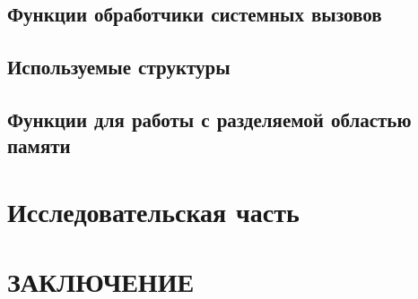 \documentclass{bmstu}
\begin{document}
\section{Функции обработчики системных вызовов}

\section{Используемые структуры}

\section{Функции для работы с разделяемой областью памяти}

\chapter{Исследовательская часть}

\chapter{ЗАКЛЮЧЕНИЕ}
\end{document}
